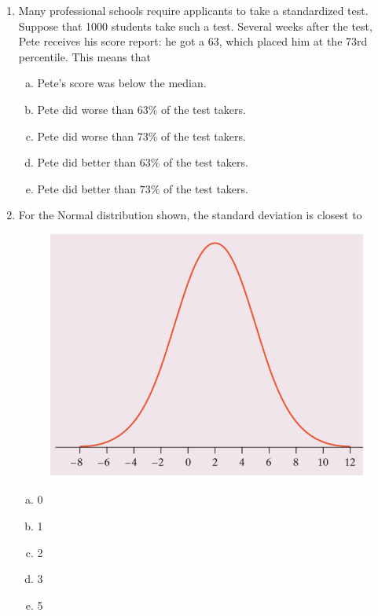 \documentclass[a4paper,12pt,twoside]{book}
\begin{document}
\begin{itemize}
\begin{enumerate}
   \item   Many professional schools require applicants to take a standardized test. Suppose that 1000 students take such a test. Several weeks after the test, Pete receives his score report: he got a 63, which placed him at the 73rd percentile. This means that 
   
       \begin{enumerate}[(a)]
           \item Pete’s score was below the median.
           \item Pete did worse than $63\%$ of the test takers.
           \item Pete did worse than $73\%$ of the test takers.
           \item Pete did better than $63\%$ of the test takers.
           \item Pete did better than $73\%$ of the test takers.
       \end{enumerate}        
         \vspace{0.3cm}
   
   \item  For the Normal distribution shown, the standard deviation is closest to
       \begin{figure}[H]
           \centering
           \includegraphics[scale=0.5]{figure13}
       \end{figure}
       
       \begin{multicols}{5}
       \begin{enumerate}[(a), start = 1]
           \item 0
           \item 1
           \item 2
           \item 3
           \item 5
       \end{enumerate}
       \end{multicols}
       

\end{enumerate}
\end{itemize}
\end{document}
